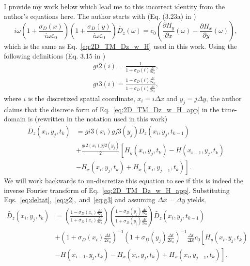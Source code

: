 \documentclass[12pt]{article}
\begin{document}
I provide my work below which lead me to this incorrect identity from the author's equations here. The author starts with (Eq. (3.23a) in \cite{Sullivan00})
\begin{equation}
\label{eq:2D_TM_Dz_w_H_app}i\omega\left(1+\frac{\sigma_D(x)}{i\omega\varepsilon_0}\right)\left(1+\frac{\sigma_D(y)}{i\omega\varepsilon_0}\right)\tilde{D_z}(\omega) = c_0\left(\frac{\partial H_y}{\partial x}(\omega)-\frac{\partial H_x}{\partial y}(\omega)\right),
\end{equation}
which is the same as Eq.~\ref{eq:2D_TM_Dz_w_H} used in this work. Using the following definitions (Eq. 3.15  in \cite{Sullivan00})
\begin{subequations}
\begin{align}
\label{eq:g2}gi2(i) = \frac{1}{1+\sigma_D(i)\frac{\Delta t}{2\varepsilon_0}},\\
\label{eq:g3}gi3(i) = \frac{1-\sigma_D(i)\frac{\Delta t}{2\varepsilon_0}}{1+\sigma_D(i)\frac{\Delta t}{2\varepsilon_0}},
\end{align}
\end{subequations}
where $i$ is the discretized spatial coordinate, $x_i = i\Delta x$ and $y_j = j\Delta y$, the author claims that the discrete form of Eq.~\ref{eq:2D_TM_Dz_w_H_app} in the time-domain is (rewritten in the notation used in this work)
\begin{equation}
\label{eq:Sullivan_Dz}
\begin{split}
\tilde{D_z}(x_i,y_j,t_k) &= gi3(x_i)gj3(y_j)\tilde{D_z}(x_i,y_j,t_{k-1})\\
 &+ \frac{gi2(x_i)gj2(y_j)}{2}\left[H_y(x_i,y_j,t_k)-H(x_{i-1},y_j,t_k)\right.\\
&\left.-H_x(x_i,y_j,t_k)+H_x(x_i,y_{j-1},t_k)\right].
\end{split}
\end{equation}
We will work backwards to un-discretize this equation to see if this is indeed the inverse Fourier transform of Eq.~\ref{eq:2D_TM_Dz_w_H_app}. Substituting Eqs.~\ref{eq:deltat},~\ref{eq:g2},~and~\ref{eq:g3} and assuming $\Delta x = \Delta y$ yields,
\begin{equation}
\begin{split}
\tilde{D_z}(x_i,y_j,t_k) &= \left(\frac{1-\sigma_D(x_i)\frac{\Delta t}{2\varepsilon_0}}{1+\sigma_D(x_i)\frac{\Delta t}{2\varepsilon_0}}\right)\left(\frac{1-\sigma_D(y_j)\frac{\Delta t}{2\varepsilon_0}}{1+\sigma_D(y_j)\frac{\Delta t}{2\varepsilon_0}}\right)\tilde{D_z}(x_i,y_j,t_{k-1})\\
 &+ \left(1+\sigma_D(x_i)\frac{\Delta t}{2\varepsilon_0}\right)^{-1}\left(1+\sigma_D(y_j)\frac{\Delta t}{2\varepsilon_0}\right)^{-1}\frac{\Delta t}{\Delta x}c_0\left[H_y(x_i,y_j,t_k)\right. \\
&\left.-H(x_{i-1},y_j,t_k)-H_x(x_i,y_j,t_k)+H_x(x_i,y_{j-1},t_k)\right].
\end{split}
\end{equation}
\end{document}
